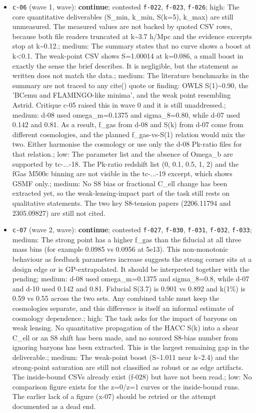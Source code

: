 \documentclass[11pt,a4paper]{article}
\begin{document}
\begin{itemize}
  \item \texttt{c-06} (wave 1, wave): \textbf{continue}; contested \texttt{f-022}, \texttt{f-023}, \texttt{f-026}; high: The core quantitative deliverables (S\_min, k\_min, S(k=5), k\_max) are still unmeasured. The measured values are not backed by quoted CSV rows, because both file readers truncated at k\textasciitilde{}3.7 h/Mpc and the evidence excerpts stop at k\textasciitilde{}0.12.; medium: The summary states that no curve shows a boost at k\textless{}0.1. The weak-point CSV shows S=1.00014 at k=0.086, a small boost in exactly the sense the brief describes. It is negligible, but the statement as written does not match the data.; medium: The literature benchmarks in the summary are not traced to any cite() quote or finding: OWLS S(1)\textasciitilde{}0.90, the 'BCemu and FLAMINGO-like minima', and the weak point resembling Astrid. Critique c-05 raised this in wave 0 and it is still unaddressed.; medium: d-08 used omega\_m=0.1375 and sigma\_8=0.80, while d-07 used 0.142 and 0.81. As a result, f\_gas from d-08 and S(k) from d-07 come from different cosmologies, and the planned f\_gas-vs-S(1) relation would mix the two. Either harmonise the cosmology or use only the d-08 Pk-ratio files for that relation.; low: The parameter list and the absence of Omega\_b are supported by tc-...-18. The Pk-ratio redshift list (0, 0.1, 0.5, 1, 2) and the fGas M500c binning are not visible in the tc-...-19 excerpt, which shows GSMF only.; medium: No S8 bias or fractional C\_ell change has been extracted yet, so the weak-lensing-impact part of the task still rests on qualitative statements. The two key S8-tension papers (2206.11794 and 2305.09827) are still not cited.
  \item \texttt{c-07} (wave 2, wave): \textbf{continue}; contested \texttt{f-027}, \texttt{f-030}, \texttt{f-031}, \texttt{f-032}, \texttt{f-033}; medium: The strong point has a higher f\_gas than the fiducial at all three mass bins (for example 0.0985 vs 0.0956 at 5e13). This non-monotonic behaviour as feedback parameters increase suggests the strong corner sits at a design edge or is GP-extrapolated. It should be interpreted together with the pending; medium: d-08 used omega\_m=0.1375 and sigma\_8=0.8, while d-07 and d-10 used 0.142 and 0.81. Fiducial S(3.7) is 0.901 vs 0.892 and k(1\%) is 0.59 vs 0.55 across the two sets. Any combined table must keep the cosmologies separate, and this difference is itself an informal estimate of cosmology dependence.; high: The task asks for the impact of baryons on weak lensing. No quantitative propagation of the HACC S(k) into a shear C\_ell or an S8 shift has been made, and no sourced S8-bias number from ignoring baryons has been extracted. This is the largest remaining gap in the deliverable.; medium: The weak-point boost (S\textasciitilde{}1.011 near k\textasciitilde{}2.4) and the strong-point saturation are still not classified as robust or as edge artifacts. The inside-bound CSVs already exist (f-028) but have not been read.; low: No comparison figure exists for the z=0/z=1 curves or the inside-bound runs. The earlier lack of a figure (x-07) should be retried or the attempt documented as a dead end.

\end{itemize}
\end{document}
